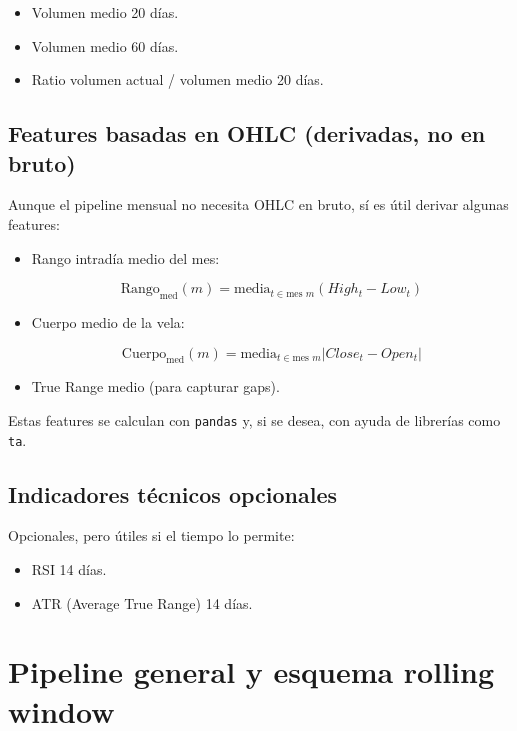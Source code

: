 \documentclass[12pt]{article}
\begin{document}
\begin{itemize}
    \item Volumen medio 20 días.
    \item Volumen medio 60 días.
    \item Ratio volumen actual / volumen medio 20 días.
\end{itemize}

\subsection{Features basadas en OHLC (derivadas, no en bruto)}

Aunque el pipeline mensual no necesita OHLC en bruto, sí es útil derivar algunas features:

\begin{itemize}
    \item Rango intradía medio del mes:
    

\[
    \text{Rango}_{\text{med}}(m) = \text{media}_{t \in \text{mes } m} (High_t - Low_t)
    \]


    \item Cuerpo medio de la vela:
    

\[
    \text{Cuerpo}_{\text{med}}(m) = \text{media}_{t \in \text{mes } m} |Close_t - Open_t|
    \]


    \item True Range medio (para capturar gaps).
\end{itemize}

Estas features se calculan con \texttt{pandas} y, si se desea, con ayuda de librerías como \texttt{ta}.

\subsection{Indicadores técnicos opcionales}

Opcionales, pero útiles si el tiempo lo permite:

\begin{itemize}
    \item RSI 14 días.
    \item ATR (Average True Range) 14 días.
\end{itemize}

\section{Pipeline general y esquema rolling window}
\end{document}
